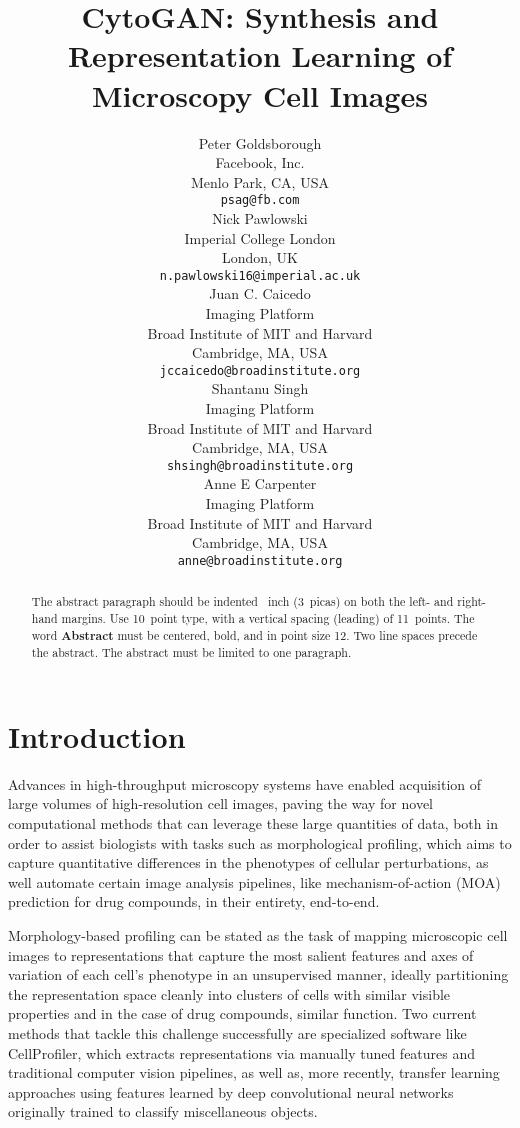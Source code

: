 \documentclass{article}
\title{CytoGAN: Synthesis and Representation Learning of Microscopy Cell Images}
\author{
  Peter Goldsborough \\
  Facebook, Inc.\\
  Menlo Park, CA, USA \\
  \texttt{psag@fb.com} \\
  \And
  Nick Pawlowski \\
  Imperial College London \\
  London, UK \\
  \texttt{n.pawlowski16@imperial.ac.uk} \\
  \AND
  Juan C. Caicedo \\
  Imaging Platform \\
  Broad Institute of MIT and Harvard \\
  Cambridge, MA, USA \\
  \texttt{jccaicedo@broadinstitute.org} \\
  \And
  Shantanu Singh \\
  Imaging Platform \\
  Broad Institute of MIT and Harvard \\
  Cambridge, MA, USA \\
  \texttt{shsingh@broadinstitute.org} \\
  \And
  Anne E Carpenter \\
  Imaging Platform \\
  Broad Institute of MIT and Harvard \\
  Cambridge, MA, USA \\
  \texttt{anne@broadinstitute.org} \\
}
\begin{document}
\maketitle

\begin{abstract}
  The abstract paragraph should be indented ~inch
  (3~picas) on both the left- and right-hand margins. Use 10~point
  type, with a vertical spacing (leading) of 11~points.  The word
  \textbf{Abstract} must be centered, bold, and in point size 12. Two
  line spaces precede the abstract. The abstract must be limited to
  one paragraph.
\end{abstract}

\section{Introduction}

Advances in high-throughput microscopy systems have enabled acquisition of large volumes of high-resolution cell images, paving the way for novel computational methods that can leverage these large quantities of data, both in order to assist biologists with tasks such as morphological profiling, which aims to capture quantitative differences in the phenotypes of cellular perturbations, as well automate certain image analysis pipelines, like mechanism-of-action (MOA) prediction for drug compounds, in their entirety, end-to-end.


Morphology-based profiling can be stated as the task of mapping microscopic cell images to representations that capture the most salient features and axes of variation of each cell's phenotype in an unsupervised manner, ideally partitioning the representation space cleanly into clusters of cells with similar visible properties and in the case of drug compounds, similar function. Two current methods that tackle this challenge successfully are specialized software like CellProfiler, which extracts representations via manually tuned features and traditional computer vision pipelines, as well as, more recently, transfer learning approaches using features learned by deep convolutional neural networks originally trained to classify miscellaneous objects.
\end{document}
